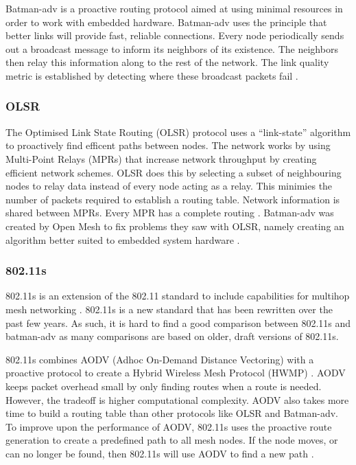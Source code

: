 Batman-adv is a proactive routing protocol aimed at using minimal resources in order to work with embedded hardware. 
Batman-adv uses the principle that better links will provide fast, reliable connections. Every node periodically sends out a broadcast message to inform its neighbors of its existence. The neighbors then relay this information along to the rest of the network. The link quality metric is established by detecting where these broadcast packets fail \cite{5375690}. 


\subsubsection{OLSR}

The Optimised Link State Routing (OLSR) protocol uses a ``link-state'' algorithm to proactively find efficent paths between nodes. The network works by using Multi-Point Relays (MPRs) that increase network throughput by creating efficient network schemes. OLSR does this by selecting a subset of neighbouring nodes to relay data instead of every node acting as a relay. This minimies the number of packets required to establish a routing table. Network information is shared between MPRs. Every MPR has a complete routing \cite{5375690}. Batman-adv was created by Open Mesh to fix problems they saw with OLSR, namely creating an algorithm better suited to embedded system hardware \cite{0032}. 

\subsubsection{802.11s}

802.11s is an extension of the 802.11 standard to include capabilities for multihop mesh networking \cite{6178212} \cite{5483777}. 802.11s is a new standard that has been rewritten over the past few years. As such, it is hard to find a good comparison between 802.11s and batman-adv as many comparisons are based on older, draft versions of 802.11s. 

802.11s combines AODV (Adhoc On-Demand Distance Vectoring) with a proactive protocol to create a Hybrid Wireless Mesh Protocol (HWMP) \cite{6379142}. AODV keeps packet overhead small by only finding routes when a route is needed. However, the tradeoff is higher computational complexity. AODV also takes more time to build a routing table than other protocols like OLSR and Batman-adv. To improve upon the performance of AODV, 802.11s uses the proactive route generation to create a predefined path to all mesh nodes. If the node moves, or can no longer be found, then 802.11s will use AODV to find a new path \cite{5483777}. 


